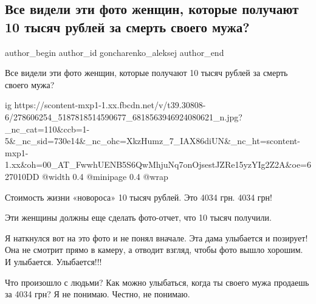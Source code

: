  
 
 
 
 
 
\subsection{Все видели эти фото женщин, которые получают 10 тысяч рублей за смерть своего мужа?}
\label{sec:26_04_2022.fb.goncharenko_aleksej.1.rubli_z_novoros}
 
\ifcmt
 author_begin
   author_id goncharenko_aleksej
 author_end
\fi

Все видели эти фото женщин, которые получают 10 тысяч рублей за смерть своего
мужа? 

\ifcmt
  ig https://scontent-mxp1-1.xx.fbcdn.net/v/t39.30808-6/278606254_5187818514590677_6818563946924080621_n.jpg?_nc_cat=110&ccb=1-5&_nc_sid=730e14&_nc_ohc=XkzHumz_7_IAX86diUN&_nc_ht=scontent-mxp1-1.xx&oh=00_AT_FwwhUENB5S6QwMhjuNq7onOjsestJZRe15yzYIg2Z2A&oe=627010DD
  @width 0.4
  @minipage 0.4
  @wrap \parpic[r]
\fi

Стоимость жизни «новороса» 10 тысяч рублей. Это 4034 грн. 4034 грн! 

Эти женщины должны еще сделать фото-отчет, что 10 тысяч получили. 

Я наткнулся вот на это фото и не понял вначале. Эта дама улыбается и позирует!
Она не смотрит прямо в камеру, а отводит взгляд, чтобы фото вышло хорошим. И
улыбается. Улыбается!!!

Что произошло с людьми? Как можно улыбаться, когда ты своего мужа продаешь за
4034 грн? Я не понимаю. Честно, не понимаю.

